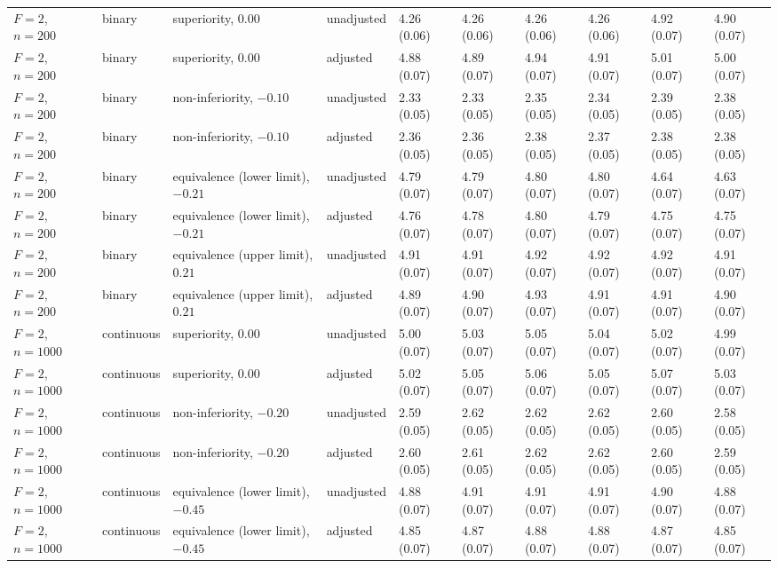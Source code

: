 \begin{landscape}
\begin{singlespace}
\begin{longtable}{@{}llllllllll@{}}
$F=2$, $n=200$ & binary & superiority, $0.00$ & unadjusted & 4.26 (0.06) & 4.26 (0.06) & 4.26 (0.06) & 4.26 (0.06) & 4.92 (0.07) & 4.90 (0.07)\\
$F=2$, $n=200$ & binary & superiority, $0.00$ & adjusted & 4.88 (0.07) & 4.89 (0.07) & 4.94 (0.07) & 4.91 (0.07) & 5.01 (0.07) & 5.00 (0.07)\\
$F=2$, $n=200$ & binary & non-inferiority, $-0.10$ & unadjusted & 2.33 (0.05) & 2.33 (0.05) & 2.35 (0.05) & 2.34 (0.05) & 2.39 (0.05) & 2.38 (0.05)\\
$F=2$, $n=200$ & binary & non-inferiority, $-0.10$ & adjusted & 2.36 (0.05) & 2.36 (0.05) & 2.38 (0.05) & 2.37 (0.05) & 2.38 (0.05) & 2.38 (0.05)\\
$F=2$, $n=200$ & binary & equivalence (lower limit), $-0.21$ & unadjusted & 4.79 (0.07) & 4.79 (0.07) & 4.80 (0.07) & 4.80 (0.07) & 4.64 (0.07) & 4.63 (0.07)\\
$F=2$, $n=200$ & binary & equivalence (lower limit), $-0.21$ & adjusted & 4.76 (0.07) & 4.78 (0.07) & 4.80 (0.07) & 4.79 (0.07) & 4.75 (0.07) & 4.75 (0.07)\\
$F=2$, $n=200$ & binary & equivalence (upper limit), $0.21$ & unadjusted & 4.91 (0.07) & 4.91 (0.07) & 4.92 (0.07) & 4.92 (0.07) & 4.92 (0.07) & 4.91 (0.07)\\
$F=2$, $n=200$ & binary & equivalence (upper limit), $0.21$ & adjusted & 4.89 (0.07) & 4.90 (0.07) & 4.93 (0.07) & 4.91 (0.07) & 4.91 (0.07) & 4.90 (0.07)\\
$F=2$, $n=1000$ & continuous & superiority, $0.00$ & unadjusted & 5.00 (0.07) & 5.03 (0.07) & 5.05 (0.07) & 5.04 (0.07) & 5.02 (0.07) & 4.99 (0.07)\\
$F=2$, $n=1000$ & continuous & superiority, $0.00$ & adjusted & 5.02 (0.07) & 5.05 (0.07) & 5.06 (0.07) & 5.05 (0.07) & 5.07 (0.07) & 5.03 (0.07)\\
$F=2$, $n=1000$ & continuous & non-inferiority, $-0.20$ & unadjusted & 2.59 (0.05) & 2.62 (0.05) & 2.62 (0.05) & 2.62 (0.05) & 2.60 (0.05) & 2.58 (0.05)\\
$F=2$, $n=1000$ & continuous & non-inferiority, $-0.20$ & adjusted & 2.60 (0.05) & 2.61 (0.05) & 2.62 (0.05) & 2.62 (0.05) & 2.60 (0.05) & 2.59 (0.05)\\
$F=2$, $n=1000$ & continuous & equivalence (lower limit), $-0.45$ & unadjusted & 4.88 (0.07) & 4.91 (0.07) & 4.91 (0.07) & 4.91 (0.07) & 4.90 (0.07) & 4.88 (0.07)\\
$F=2$, $n=1000$ & continuous & equivalence (lower limit), $-0.45$ & adjusted & 4.85 (0.07) & 4.87 (0.07) & 4.88 (0.07) & 4.88 (0.07) & 4.87 (0.07) & 4.85 (0.07)\\

\end{longtable}
\end{singlespace}
\end{landscape}
